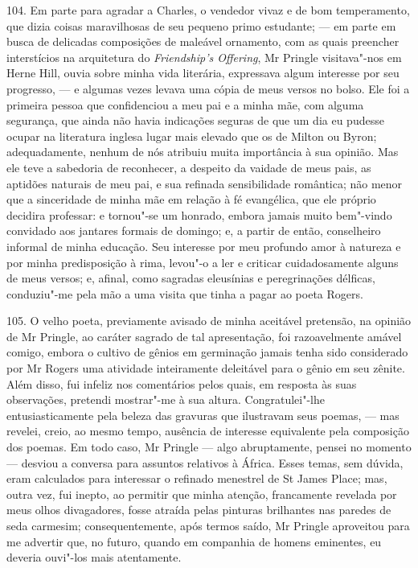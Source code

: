 104. Em parte para agradar a Charles, o vendedor vivaz e de bom
temperamento, que dizia coisas maravilhosas de seu pequeno primo
estudante; --- em parte em busca de delicadas composições de maleável
ornamento, com as quais preencher interstícios na arquitetura do
\emph{Friendship's Offering}, Mr Pringle visitava"-nos em Herne Hill,
ouvia sobre minha vida literária, expressava algum interesse por seu
progresso, --- e algumas vezes levava uma cópia de meus versos no bolso.
Ele foi a primeira pessoa que confidenciou a meu pai e a minha mãe, com
alguma segurança, que ainda não havia indicações seguras de que um dia
eu pudesse ocupar na literatura inglesa lugar mais elevado que os de
Milton ou Byron; adequadamente, nenhum de nós atribuiu muita
importância à sua opinião. Mas ele teve a sabedoria de reconhecer, a
despeito da vaidade de meus pais, as aptidões naturais de meu pai, e sua
refinada sensibilidade romântica; não menor que a sinceridade de minha
mãe em relação à fé evangélica, que ele próprio decidira professar: e
tornou"-se um honrado, embora jamais muito bem"-vindo convidado aos
jantares formais de domingo; e, a partir de então, conselheiro informal
de minha educação. Seu interesse por meu profundo amor à natureza e por
minha predisposição à rima, levou"-o a ler e criticar cuidadosamente
alguns de meus versos; e, afinal, como sagradas eleusínias e
peregrinações délficas, conduziu"-me pela mão a uma visita que tinha a
pagar ao poeta Rogers.

105. O velho poeta, previamente avisado de minha aceitável pretensão, na
opinião de Mr Pringle, ao caráter sagrado de tal apresentação, foi
razoavelmente amável comigo, embora o cultivo de gênios em germinação
jamais tenha sido considerado por Mr Rogers uma atividade inteiramente
deleitável para o gênio em seu zênite. Além disso, fui infeliz nos
comentários pelos quais, em resposta às suas observações, pretendi
mostrar"-me à sua altura. Congratulei"-lhe entusiasticamente pela beleza
das gravuras que ilustravam seus poemas, --- mas revelei, creio, ao mesmo
tempo, ausência de interesse equivalente pela composição dos poemas. Em
todo caso, Mr Pringle --- algo abruptamente, pensei no momento --- desviou
a conversa para assuntos relativos à África. Esses temas, sem dúvida,
eram calculados para interessar o refinado menestrel de St James Place;
mas, outra vez, fui inepto, ao permitir que minha atenção, francamente
revelada por meus olhos divagadores, fosse atraída pelas pinturas
brilhantes nas paredes de seda carmesim; consequentemente, após termos
saído, Mr Pringle aproveitou para me advertir que, no futuro, quando em
companhia de homens eminentes, eu deveria ouvi"-los mais atentamente.

